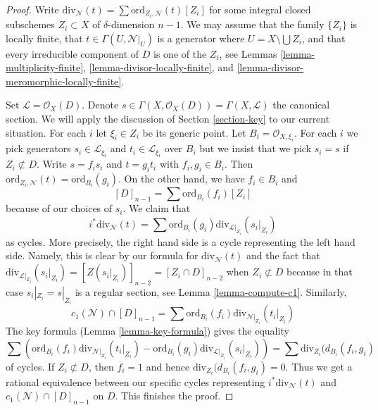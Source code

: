 \begin{proof}
Write $\text{div}_\mathcal{N}(t) = \sum \text{ord}_{Z_i, \mathcal{N}}(t)[Z_i]$
for some integral closed subschemes $Z_i \subset X$ of $\delta$-dimension
$n - 1$. We may assume that the family $\{Z_i\}$ is locally
finite, that $t \in \Gamma(U, \mathcal{N}|_U)$ is a generator
where $U = X \setminus \bigcup Z_i$, and that every irreducible component
of $D$ is one of the $Z_i$, see
Lemmas \ref{lemma-multiplicity-finite},
\ref{lemma-divisor-locally-finite}, and
\ref{lemma-divisor-meromorphic-locally-finite}.

\medskip\noindent
Set $\mathcal{L} = \mathcal{O}_X(D)$. Denote
$s \in \Gamma(X, \mathcal{O}_X(D)) = \Gamma(X, \mathcal{L})$
the canonical section. We will apply the discussion of
Section \ref{section-key} to our current situation.
For each $i$ let $\xi_i \in Z_i$ be its generic point. Let
$B_i = \mathcal{O}_{X, \xi_i}$. For each $i$ we pick generators
$s_i \in \mathcal{L}_{\xi_i}$ and $t_i \in \mathcal{L}_{\xi_i}$
over $B_i$ but we insist that we pick $s_i = s$ if $Z_i \not \subset D$.
Write $s = f_i s_i$ and $t = g_i t_i$ with $f_i, g_i \in B_i$.
Then $\text{ord}_{Z_i, \mathcal{N}}(t) = \text{ord}_{B_i}(g_i)$.
On the other hand, we have $f_i \in B_i$ and
$$
[D]_{n - 1} = \sum \text{ord}_{B_i}(f_i)[Z_i]
$$
because of our choices of $s_i$. We claim that
$$
i^*\text{div}_\mathcal{N}(t) =
\sum \text{ord}_{B_i}(g_i) \text{div}_{\mathcal{L}|_{Z_i}}(s_i|_{Z_i})
$$
as cycles. More precisely, the right hand side is a cycle
representing the left hand side. Namely, this is clear by our
formula for $\text{div}_\mathcal{N}(t)$ and the fact that
$\text{div}_{\mathcal{L}|_{Z_i}}(s_i|_{Z_i}) = [Z(s_i|_{Z_i})]_{n - 2} =
[Z_i \cap D]_{n - 2}$ when $Z_i \not \subset D$ because in
that case $s_i|_{Z_i} = s|_{Z_i}$ is a regular section, see
Lemma \ref{lemma-compute-c1}. Similarly,
$$
c_1(\mathcal{N}) \cap [D]_{n - 1} =
\sum \text{ord}_{B_i}(f_i) \text{div}_{\mathcal{N}|_{Z_i}}(t_i|_{Z_i})
$$
The key formula (Lemma \ref{lemma-key-formula}) gives the equality
$$
\sum \left(
\text{ord}_{B_i}(f_i) \text{div}_{\mathcal{N}|_{Z_i}}(t_i|_{Z_i}) -
\text{ord}_{B_i}(g_i) \text{div}_{\mathcal{L}|_{Z_i}}(s_i|_{Z_i}) \right)
= \sum \text{div}_{Z_i}(d_{B_i}(f_i, g_i)
$$
of cycles. If $Z_i \not \subset D$, then $f_i = 1$ and hence
$\text{div}_{Z_i}(d_{B_i}(f_i, g_i) = 0$. Thus we get a rational
equivalence between our specific cycles representing
$i^*\text{div}_\mathcal{N}(t)$ and $c_1(\mathcal{N}) \cap [D]_{n - 1}$
on $D$. This finishes the proof.
\end{proof}

